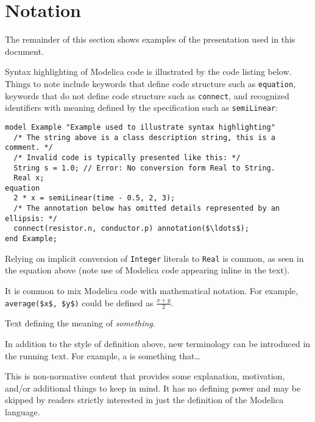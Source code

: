 
\section{Notation}\label{notation}

The remainder of this section shows examples of the presentation used in this document.

Syntax highlighting of Modelica code is illustrated by the code listing below.
Things to note include keywords that define code structure such as \lstinline!equation!, keywords that do not define code structure such as \lstinline!connect!, and recognized identifiers with meaning defined by the specification such as \lstinline!semiLinear!:
\begin{lstlisting}[language=modelica]
model Example "Example used to illustrate syntax highlighting"
  /* The string above is a class description string, this is a comment. */
  /* Invalid code is typically presented like this: */
  String s = 1.0; // Error: No conversion form Real to String.
  Real x;
equation
  2 * x = semiLinear(time - 0.5, 2, 3);
  /* The annotation below has omitted details represented by an ellipsis: */
  connect(resistor.n, conductor.p) annotation($\ldots$);
end Example;
\end{lstlisting}

Relying on implicit conversion of \lstinline!Integer! literals to \lstinline!Real! is common, as seen in the equation above (note use of Modelica code appearing inline in the text).

It is common to mix Modelica code with mathematical notation.
For example, \lstinline!average($x$, $y$)! could be defined as $\frac{x + y}{2}$.

\begin{definition}[Something]%
Text defining the meaning of \emph{something}.
\end{definition}

In addition to the style of definition above, new terminology can be introduced in the running text.
For example, a  is something that\ldots

\begin{nonnormative}
This is non-normative content that provides some explanation, motivation, and/or additional things to keep in mind.
It has no defining power and may be skipped by readers strictly interested in just the definition of the Modelica language.
\end{nonnormative}

